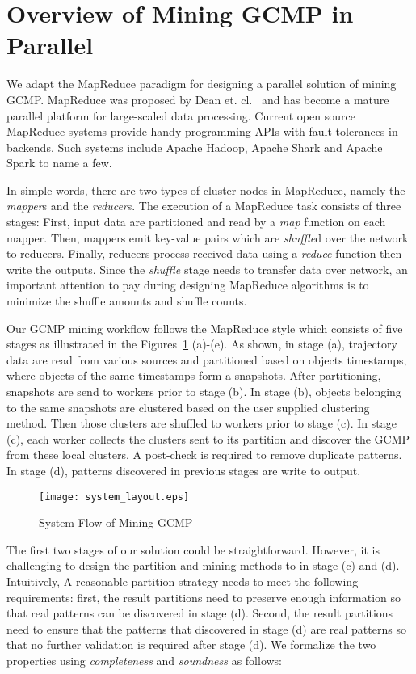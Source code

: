 \section{Overview of Mining GCMP in Parallel}
\label{sec:system_overview}
We adapt the MapReduce paradigm for designing
a parallel solution of mining GCMP. MapReduce was proposed by Dean et. cl.~\cite{}
and has become a mature parallel platform for large-scaled data processing. 
Current open source MapReduce systems provide handy programming APIs with fault tolerances
in backends. Such systems 
include Apache Hadoop, Apache Shark and Apache Spark to name a few.

In simple words, there are two types of cluster nodes in MapReduce, namely the 
\emph{mapper}s and the \emph{reducer}s. The execution of a MapReduce task consists of
three stages: First, input data
are partitioned and read by a \emph{map} function on each mapper. Then, mappers
emit key-value pairs which are \emph{shuffle}d over the network to reducers. Finally,
reducers process received data using a \emph{reduce} function then write the
outputs.
Since the \emph{shuffle} stage needs to transfer data over network, 
an important attention to pay during designing MapReduce algorithms is 
to minimize the shuffle amounts and shuffle counts. 

Our GCMP mining workflow follows the MapReduce style which consists of five stages
as illustrated in the Figures~\ref{fig:overview} (a)-(e).
As shown, in stage (a), trajectory data 
are read from various sources and partitioned based on objects timestamps, where objects
of the same timestamps form a snapshots. After partitioning, snapshots are send to workers
prior to stage (b). In stage (b), objects belonging to the same snapshots are clustered
based on the user supplied clustering method. Then those clusters are shuffled to 
workers prior to stage (c). In stage (c), each worker collects the clusters sent to its partition
and discover the GCMP from these local clusters. A post-check is required to remove
duplicate patterns. In stage (d), patterns discovered in previous stages are write to output.


\begin{figure} [t]
\center
\texttt{[image: system\_layout.eps]}
\caption{System Flow of Mining GCMP}
\label{fig:overview}
\end{figure}


The first two stages of our solution could be straightforward. 
However, it is challenging to design the partition and mining methods
to in stage (c) and (d). Intuitively, A reasonable partition strategy 
needs to meet the following requirements: first, the result partitions need
to preserve enough information so that real patterns can be discovered
in stage (d). Second, the result partitions need to ensure that
the patterns that discovered in stage (d) are real patterns so that
no further validation is required after stage (d). We formalize the two 
properties using \emph{completeness} and \emph{soundness} as follows:

